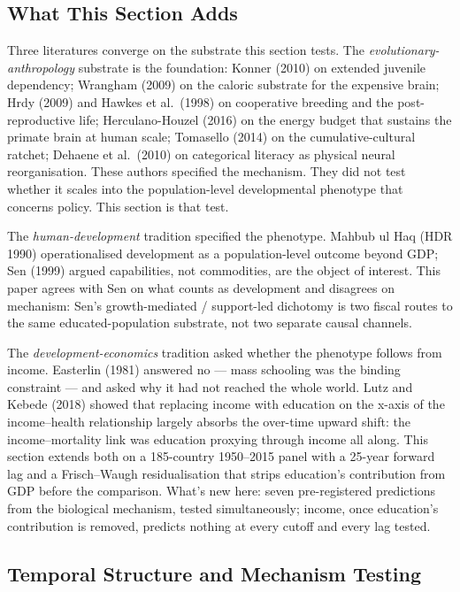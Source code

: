 \documentclass[12pt,letterpaper]{article}
\begin{document}
\subsection{What This Section Adds}\label{what-this-section-adds}

Three literatures converge on the substrate this section tests.
The \emph{evolutionary-anthropology} substrate is the foundation: Konner
(2010) on extended juvenile dependency; Wrangham (2009) on the caloric
substrate for the expensive brain; Hrdy (2009) and Hawkes et al.~(1998)
on cooperative breeding and the post-reproductive life; Herculano-Houzel
(2016) on the energy budget that sustains the primate brain at human
scale; Tomasello (2014) on the cumulative-cultural ratchet; Dehaene et
al.~(2010) on categorical literacy as physical neural reorganisation.
These authors specified the mechanism. They did not test whether it
scales into the population-level developmental phenotype that concerns
policy. This section is that test.

The \emph{human-development} tradition specified the phenotype. Mahbub
ul Haq (HDR 1990) operationalised development as a population-level
outcome beyond GDP; Sen (1999) argued capabilities, not commodities, are
the object of interest. This paper agrees with Sen on what counts as
development and disagrees on mechanism: Sen's growth-mediated /
support-led dichotomy is two fiscal routes to the same
educated-population substrate, not two separate causal channels.

The \emph{development-economics} tradition asked whether the phenotype
follows from income. Easterlin (1981) answered no --- mass schooling was
the binding constraint --- and asked why it had not reached the whole
world. Lutz and Kebede (2018) showed that replacing income with education
on the x-axis of the income--health relationship largely absorbs the
over-time upward shift: the income--mortality link was education
proxying through income all along. This section extends both on a
185-country 1950--2015 panel with a 25-year forward lag and a
Frisch--Waugh residualisation that strips education's contribution from
GDP before the comparison. What's new here: seven pre-registered
predictions from the biological mechanism, tested simultaneously;
income, once education's contribution is removed, predicts nothing at
every cutoff and every lag tested.

\subsection{Temporal Structure and Mechanism Testing}\label{causal-identification-the-bad-control-problem-and-natural-experiments}
\end{document}
